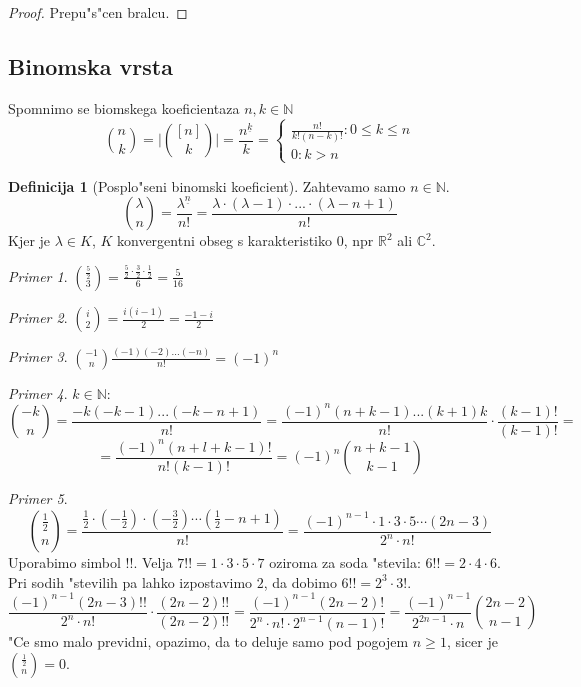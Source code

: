 \documentclass[a4paper,12pt]{article}
\theoremstyle{definition}
\newtheorem{defn}[counter]{Definicija}
\theoremstyle{remark}
\newtheorem*{ex}{Primer}
\newcommand{\N}{\mathbb{N}}
\newcommand{\R}{\mathbb{R}}
\newcommand{\C}{\mathbb{C}}
\begin{document}
\begin{proof}
    Prepu"s"cen bralcu.
\end{proof}


\subsection{Binomska vrsta}
Spomnimo se biomskega koeficientaza $n, k \in \N$
\[\binom{n}{k} = \bigg|\binom{[n]}{k}\bigg| = \frac{n^{\underline{k}}}{k} = \begin{cases}\frac{n!}{k!(n-k)!}: 0 \leqslant k \leqslant n \\ 0: k > n\end{cases}\] %
\begin{defn}[Posplo"seni binomski koeficient]
	Zahtevamo samo $n \in \N$.
	\[\binom{\lambda}{n} = \frac{\lambda^{\underline{n}}}{n!} = \frac{\lambda \cdot (\lambda - 1) \cdot ... \cdot (\lambda - n + 1)}{n!}\]
	Kjer je $\lambda \in K$, $K$ konvergentni obseg s karakteristiko $0$, npr $\R^2$ ali $\C^2$.
\end{defn}
\begin{ex}
	$\binom{\frac{5}{2}}{3} = \frac{\frac{5}{2} \cdot \frac{3}{2} \cdot \frac{1}{2}}{6} = \frac{5}{16}$
\end{ex}
\begin{ex}
	$\binom{i}{2} = \frac{i (i - 1)}{2} = \frac{-1 -i}{2}$
\end{ex}
\begin{ex}
	$\binom{-1}{n} \frac{(-1)(-2)...(-n)}{n!} = (-1)^n$
\end{ex}
\begin{ex}
	$k \in \N$:
	\[\binom{-k}{n} = \frac{-k (-k - 1) ... (-k - n + 1)}{n!} = \frac{(-1)^n (n + k - 1) ... (k + 1) k}{n!} \cdot \frac{(k - 1)!}{(k - 1)!} = \]
	\[ = \frac{(-1)^n (n+l+k-1)!}{n! (k - 1)!} = (-1)^n \binom{n + k - 1}{k - 1}\]
\end{ex}
\begin{ex}
	\[\binom{\frac{1}{2}}{n} = \frac{\frac{1}{2}\cdot(-\frac{1}{2})\cdot(-\frac{3}{2})\cdots(\frac{1}{2}-n+1)}{n!}=\frac{(-1)^{n-1}\cdot1\cdot3\cdot5\cdots(2n-3)}{2^n\cdot n!}\]
	Uporabimo simbol $!!$. Velja $7!! = 1\cdot3\cdot5\cdot7$ oziroma za soda "stevila: $6!! = 2\cdot4\cdot6$. Pri sodih "stevilih pa lahko izpostavimo $2$, da dobimo $6!! = 2^3 \cdot 3!$.
	\[\frac{(-1)^{n-1}(2n-3)!!}{2^n\cdot n!}\cdot\frac{(2n-2)!!}{(2n-2)!!} =
	\frac{(-1)^{n-1}(2n-2)!}{2^n \cdot n!\cdot 2^{n-1}(n-1)!} = \frac{(-1)^{n-1}}{2^{2n-1}\cdot n}\binom{2n-2}{n-1}\]
	"Ce smo malo previdni, opazimo, da to deluje samo pod pogojem $n \geqslant 1$, sicer je $\binom{\frac{1}{2}}{n} = 0$.
\end{ex}
\end{document}
